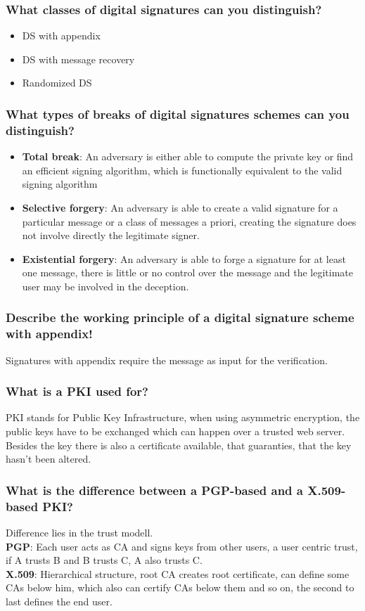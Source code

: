 \documentclass[a4paper, 10 pt, conference]{ieeeconf}
\begin{document}
\subsubsection{\textbf{What classes of digital signatures can you distinguish?}}
\begin{itemize}
\item DS with appendix
\item DS with message recovery
\item Randomized DS
\end{itemize}
\subsubsection{\textbf{What types of breaks of digital signatures schemes can you distinguish?}}
\begin{itemize}
\item \textbf{Total break}: An adversary is either able to compute the private key or find an efficient signing algorithm, which is functionally equivalent to the valid signing algorithm
\item \textbf{Selective forgery}: An adversary is able to create a valid signature for a particular message or a class of messages a priori, creating the signature does not involve directly the legitimate signer.
\item \textbf{Existential forgery}: An adversary is able to forge a signature for at least one message, there is little or no control over the message and the legitimate user may be involved in the deception. 
\end{itemize}
\subsubsection{\textbf{Describe the working principle of a digital signature scheme with appendix!}} 
Signatures with appendix require the message as input for the verification.
\subsubsection{\textbf{What is a PKI used for?}} 
PKI stands for Public Key Infrastructure, when using asymmetric encryption, the public keys have to be exchanged which can happen over a trusted web server. Besides the key there is also a certificate available, that guaranties, that the key hasn't been altered. 
\subsubsection{\textbf{What is the difference between a PGP-based and a X.509-based PKI?}} 
Difference lies in the trust modell.\\
\textbf{PGP}: Each user acts as CA and signs keys from other users, a user centric trust, if A trusts B and B trusts C, A also trusts C. \\
\textbf{X.509}: Hierarchical structure, root CA creates root certificate, can define some CAs below him, which also can certify CAs below them and so on, the second to last defines the end user. 
\end{document}
